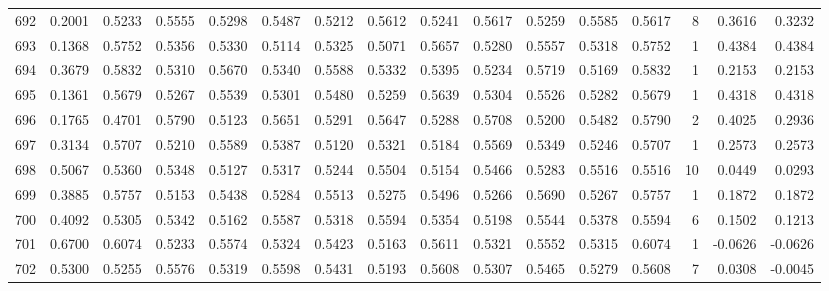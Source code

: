 \begin{tabular}{lrrrrrrrrrrrrrrr}
692 &      0.2001 &  0.5233 &  0.5555 &  0.5298 &  0.5487 &  0.5212 &  0.5612 &  0.5241 &  0.5617 &  0.5259 &   0.5585 &     0.5617 &      8 &                    0.3616 &                     0.3232 \\
693 &      0.1368 &  0.5752 &  0.5356 &  0.5330 &  0.5114 &  0.5325 &  0.5071 &  0.5657 &  0.5280 &  0.5557 &   0.5318 &     0.5752 &      1 &                    0.4384 &                     0.4384 \\
694 &      0.3679 &  0.5832 &  0.5310 &  0.5670 &  0.5340 &  0.5588 &  0.5332 &  0.5395 &  0.5234 &  0.5719 &   0.5169 &     0.5832 &      1 &                    0.2153 &                     0.2153 \\
695 &      0.1361 &  0.5679 &  0.5267 &  0.5539 &  0.5301 &  0.5480 &  0.5259 &  0.5639 &  0.5304 &  0.5526 &   0.5282 &     0.5679 &      1 &                    0.4318 &                     0.4318 \\
696 &      0.1765 &  0.4701 &  0.5790 &  0.5123 &  0.5651 &  0.5291 &  0.5647 &  0.5288 &  0.5708 &  0.5200 &   0.5482 &     0.5790 &      2 &                    0.4025 &                     0.2936 \\
697 &      0.3134 &  0.5707 &  0.5210 &  0.5589 &  0.5387 &  0.5120 &  0.5321 &  0.5184 &  0.5569 &  0.5349 &   0.5246 &     0.5707 &      1 &                    0.2573 &                     0.2573 \\
698 &      0.5067 &  0.5360 &  0.5348 &  0.5127 &  0.5317 &  0.5244 &  0.5504 &  0.5154 &  0.5466 &  0.5283 &   0.5516 &     0.5516 &     10 &                    0.0449 &                     0.0293 \\
699 &      0.3885 &  0.5757 &  0.5153 &  0.5438 &  0.5284 &  0.5513 &  0.5275 &  0.5496 &  0.5266 &  0.5690 &   0.5267 &     0.5757 &      1 &                    0.1872 &                     0.1872 \\
700 &      0.4092 &  0.5305 &  0.5342 &  0.5162 &  0.5587 &  0.5318 &  0.5594 &  0.5354 &  0.5198 &  0.5544 &   0.5378 &     0.5594 &      6 &                    0.1502 &                     0.1213 \\
701 &      0.6700 &  0.6074 &  0.5233 &  0.5574 &  0.5324 &  0.5423 &  0.5163 &  0.5611 &  0.5321 &  0.5552 &   0.5315 &     0.6074 &      1 &                   -0.0626 &                    -0.0626 \\
702 &      0.5300 &  0.5255 &  0.5576 &  0.5319 &  0.5598 &  0.5431 &  0.5193 &  0.5608 &  0.5307 &  0.5465 &   0.5279 &     0.5608 &      7 &                    0.0308 &                    -0.0045 \\

\end{tabular}

